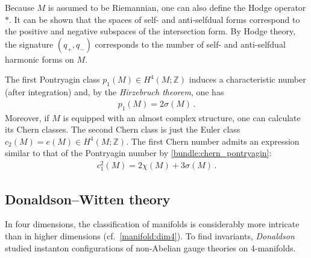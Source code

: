     Because $M$ is assumed to be Riemannian, one can also define the Hodge operator $\ast$. It can be shown that the spaces of self- and anti-selfdual forms correspond to the positive and negative subspaces of the intersection form. By Hodge theory, the signature $(q_+,q_-)$ corresponds to the number of self- and anti-selfdual harmonic forms on $M$.

    The first Pontryagin class $p_1(M)\in H^4(M;\mathbb{Z})$ induces a characteristic number (after integration) and, by the \textit{Hirzebruch theorem}, one has
    \begin{gather}
        p_1(M) = 2\sigma(M)\,.
    \end{gather}
    Moreover, if $M$ is equipped with an almost complex structure, one can calculate its Chern classes. The second Chern class is just the Euler class $c_2(M)=e(M)\in H^4(M;\mathbb{Z})$. The first Chern number admits an expression similar to that of the Pontryagin number by \cref{bundle:chern_pontryagin}:
    \begin{gather}
        c^2_1(M) = 2\chi(M) + 3\sigma(M)\,.
    \end{gather}

\subsection{Donaldson--Witten theory}

    In four dimensions, the classification of manifolds is considerably more intricate than in higher dimensions (cf.~\cref{manifold:dim4}). To find invariants, \textit{Donaldson} studied instanton configurations of non-Abelian gauge theories on 4-manifolds.

